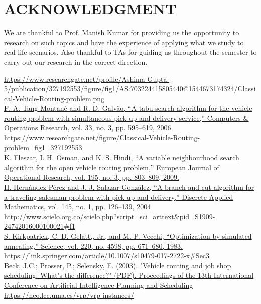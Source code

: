 \documentclass[conference]{IEEEtran}
\begin{document}
\section{{\textbf{ACKNOWLEDGMENT}}}
We are thankful to Prof. Manish Kumar for providing us the opportunity to research on such topics and have the experience of applying what we study to real-life scenarios. Also thankful to TAs for guiding us throughout the semester to carry out our research in the correct direction.









\begin{thebibliography}{00}
\bibitem{} \url{https://www.researchgate.net/profile/Ashima-Gupta-5/publication/327192553/figure/fig1/AS:703224415805440@1544673174324/Classical-Vehicle-Routing-problem.png }  \\

\bibitem{} \url{F. A. Tang Montané and R. D. Galvão, “A tabu search algorithm for the vehicle routing problem with simultaneous pick-up and delivery service,” Computers & Operations Research, vol. 33, no. 3, pp. 595–619, 2006}   \\
\bibitem{} \url{https://www.researchgate.net/figure/Classical-Vehicle-Routing-problem_fig1_327192553}   \\

\bibitem{} \url{K. Fleszar, I. H. Osman, and K. S. Hindi, “A variable neighbourhood search algorithm for the open vehicle routing problem,” European Journal of Operational Research, vol. 195, no. 3, pp. 803–809, 2009.}   \\
\bibitem{} \url{H. Hernández-Pérez and J.-J. Salazar-González, “A branch-and-cut algorithm for a traveling salesman problem with pick-up and delivery,” Discrete Applied Mathematics, vol. 145, no. 1, pp. 126–139, 2004} \\
\bibitem{} \url{http://www.scielo.org.co/scielo.php?script=sci_arttext&pid=S1909-24742016000100021#f1 } \\

\bibitem{} \url{S. Kirkpatrick, C. D. Gelatt,, Jr., and M. P. Vecchi, “Optimization by simulated annealing,” Science, vol. 220, no. 4598, pp. 671–680, 1983.}   \\
\bibitem{} \url{https://link.springer.com/article/10.1007/s10479-017-2722-x#Sec3  } \\


\bibitem{} \url{Beck, J.C.; Prosser, P.; Selensky, E. (2003). "Vehicle routing and job shop scheduling: What's the difference?" (PDF). Proceedings of the 13th International Conference on Artificial Intelligence Planning and Scheduling}   \\
\bibitem{} \url{https://neo.lcc.uma.es/vrp/vrp-instances/  } \\


\end{thebibliography}
\end{document}
